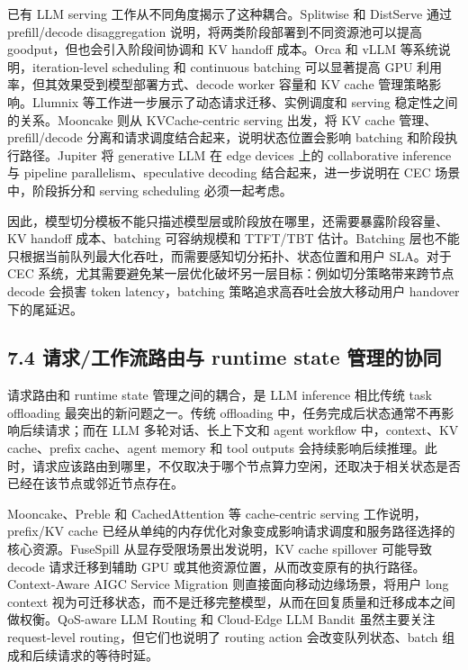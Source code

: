 \documentclass[a4paper,10pt]{ctexart}
\begin{document}
已有 LLM serving 工作从不同角度揭示了这种耦合。Splitwise 和 DistServe 通过 prefill/decode disaggregation 说明，将两类阶段部署到不同资源池可以提高 goodput，但也会引入阶段间协调和 KV handoff 成本。Orca 和 vLLM 等系统说明，iteration-level scheduling 和 continuous batching 可以显著提高 GPU 利用率，但其效果受到模型部署方式、decode worker 容量和 KV cache 管理策略影响。Llumnix 等工作进一步展示了动态请求迁移、实例调度和 serving 稳定性之间的关系。Mooncake 则从 KVCache-centric serving 出发，将 KV cache 管理、prefill/decode 分离和请求调度结合起来，说明状态位置会影响 batching 和阶段执行路径。Jupiter 将 generative LLM 在 edge devices 上的 collaborative inference 与 pipeline parallelism、speculative decoding 结合起来，进一步说明在 CEC 场景中，阶段拆分和 serving scheduling 必须一起考虑。


因此，模型切分模板不能只描述模型层或阶段放在哪里，还需要暴露阶段容量、KV handoff 成本、batching 可容纳规模和 TTFT/TBT 估计。Batching 层也不能只根据当前队列最大化吞吐，而需要感知切分拓扑、状态位置和用户 SLA。对于 CEC 系统，尤其需要避免某一层优化破坏另一层目标：例如切分策略带来跨节点 decode 会损害 token latency，batching 策略追求高吞吐会放大移动用户 handover 下的尾延迟。


\subsection*{7.4 请求/工作流路由与 runtime state 管理的协同}

请求路由和 runtime state 管理之间的耦合，是 LLM inference 相比传统 task offloading 最突出的新问题之一。传统 offloading 中，任务完成后状态通常不再影响后续请求；而在 LLM 多轮对话、长上下文和 agent workflow 中，context、KV cache、prefix cache、agent memory 和 tool outputs 会持续影响后续推理。此时，请求应该路由到哪里，不仅取决于哪个节点算力空闲，还取决于相关状态是否已经在该节点或邻近节点存在。


Mooncake、Preble 和 CachedAttention 等 cache-centric serving 工作说明，prefix/KV cache 已经从单纯的内存优化对象变成影响请求调度和服务路径选择的核心资源。FuseSpill 从显存受限场景出发说明，KV cache spillover 可能导致 decode 请求迁移到辅助 GPU 或其他资源位置，从而改变原有的执行路径。Context-Aware AIGC Service Migration 则直接面向移动边缘场景，将用户 long context 视为可迁移状态，而不是迁移完整模型，从而在回复质量和迁移成本之间做权衡。QoS-aware LLM Routing 和 Cloud-Edge LLM Bandit 虽然主要关注 request-level routing，但它们也说明了 routing action 会改变队列状态、batch 组成和后续请求的等待时延。
\end{document}
